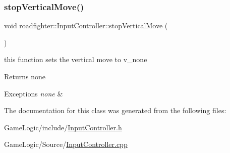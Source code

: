 \subsubsection{\texorpdfstring{stop\+Vertical\+Move()}{stopVerticalMove()}}
{\footnotesize\ttfamily void roadfighter\+::\+Input\+Controller\+::stop\+Vertical\+Move (\begin{DoxyParamCaption}{ }\end{DoxyParamCaption})}

this function sets the vertical move to v\+\_\+none \begin{DoxyReturn}{Returns}
none 
\end{DoxyReturn}

\begin{DoxyExceptions}{Exceptions}
{\em none} & \\
\hline
\end{DoxyExceptions}


The documentation for this class was generated from the following files\+:\begin{DoxyCompactItemize}
\item 
Game\+Logic/include/\hyperlink{InputController_8h}{Input\+Controller.\+h}\item 
Game\+Logic/\+Source/\hyperlink{InputController_8cpp}{Input\+Controller.\+cpp}\end{DoxyCompactItemize}
